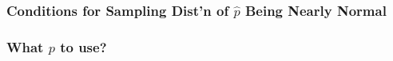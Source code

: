 \documentclass[slides]{beamer}
\newcommand{\blue}[1]{\textcolor{blue2}{#1}}
\newcommand{\xbar}{\overline{x}}
\newcommand{\phat}{\widehat{p}}
\begin{document}
\begin{frame}[fragile]
\frametitle{Conditions for Sampling Dist'n of $\phat$ Being Nearly Normal}
%
%
%
%
%
%
%
%

\end{frame}


\begin{frame}[fragile]
\frametitle{What $p$ to use?}

%
%
%

\end{frame}
\end{document}
